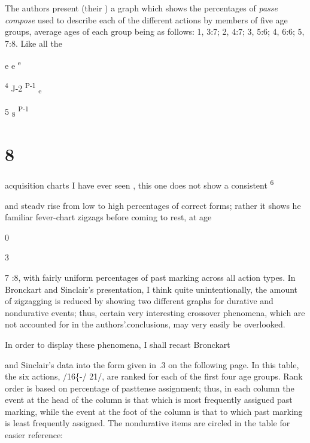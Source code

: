 

The authors present (their ) a graph which shows the percentages of \textit{passe} \textit{compose} used to describe each of the different actions by members of five age groups, average ages of each group being as follows: 1, 3:7; 2, 4:7; 3, 5:6; 4, 6:6; 5, 7:8. Like all the

e e \textsuperscript{e}

\textsuperscript{4 }J-2 \textsuperscript{P-1 }\textsubscript{e} 

5 \textsubscript{8 }\textsuperscript{P-1} 

\chapter{8}

acquisition charts I have ever seen , this one does not show a consistent\textsuperscript{ 6}

and steadv rise from low to high percentages of correct forms; rather it shows he familiar fever-chart zigzags before coming to rest, at age

0

\begin{table}
\caption{3}
\label{tab:3}
\end{table}

7 :8, with fairly uniform percentages of past marking across all action types. In Bronckart and Sinclair's presentation, I think quite unin\-tentionally, the amount of zigzagging is reduced by showing two different graphs for durative and nondurative events; thus, certain very interesting crossover phenomena, which are not accounted for in the authors'.conclusions, may very easily be overlooked.

In order to display these phenomena, I shall recast Bronckart

and Sinclair's data into the form given in .3 on the following page. In this table, the six actions, /16\{-/ 21/, are ranked for each of the first four age groups. Rank order is based on percentage of past\-tense assignment; thus, in each column the event at the head of the column is that which is most frequently assigued past marking, while the event at the foot of the column is that to which past marking is least frequently assigned. The nondurative items are circled in the
table for easier reference:


